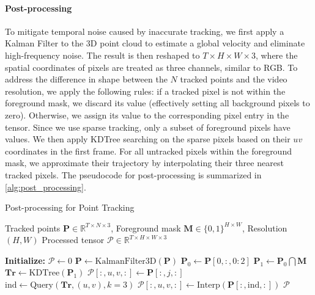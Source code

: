 \begin{appendix}
\paragraph{Post-processing}
To mitigate temporal noise caused by inaccurate tracking, we first apply a Kalman Filter to the 3D point cloud to estimate a global velocity and eliminate high-frequency noise. The result is then reshaped to $T \times H \times W \times 3$, where the spatial coordinates of pixels are treated as three channels, similar to RGB. To address the difference in shape between the $N$ tracked points and the video resolution, we apply the following rules: if a tracked pixel is not within the foreground mask, we discard its value (effectively setting all background pixels to zero). Otherwise, we assign its value to the corresponding pixel entry in the tensor. Since we use sparse tracking, only a subset of foreground pixels have values. We then apply KDTree searching on the sparse pixels based on their $uv$ coordinates in the first frame. For all untracked pixels within the foreground mask, we approximate their trajectory by interpolating their three nearest tracked pixels. The pseudocode for post-processing is summarized in \autoref{alg:post_processing}.

\begin{algorithm}[H]
\caption{Post-processing for Point Tracking}
\label{alg:post_processing}
\begin{algorithmic}[1]
\Require Tracked points $\mathbf{P} \in \mathbb{R}^{T \times N \times 3}$, Foreground mask $\mathbf{M} \in \{0, 1\}^{H \times W}$, Resolution $(H, W)$
\Ensure Processed tensor $\mathcal{P} \in \mathbb{R}^{T \times H \times W \times 3}$

\State \textbf{Initialize:} $\mathcal{P} \gets 0$ 
\State $\mathbf{P} \gets \text{KalmanFilter3D}(\mathbf{P})$ 
\State $\mathbf{P}_0 \gets \mathbf{P}[0,:,0:2]$ 
\State $\mathbf{P}_1 \gets \mathbf{P}_0 \bigcap \mathbf{M}$ 
\State $\mathbf{Tr} \gets \text{KDTree}(\mathbf{P}_1)$ 
         
            \State $\mathcal{P}[:,u,v,:] \gets \mathbf{P}[:, j, :]$
        \Else {}
            \State $\text{ind} \gets \text{Query}(\mathbf{Tr}, (u,v), k=3)$
            \State $\mathcal{P}[:,u,v,:] \gets \text{Interp}(\mathbf{P}[:,\text{ind},:])$
        \EndIf
    \EndFor
\State \Return $\mathcal{P}$
\end{algorithmic}
\end{algorithm}




\end{appendix}
